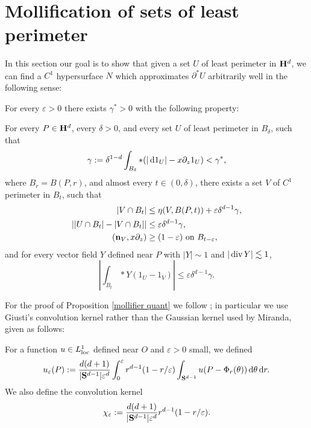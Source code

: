 \section{Mollification of sets of least perimeter}\label{MollifierSection}
In this section our goal is to show that given a set $U$ of least perimeter in $\mathbf H^d$, we can find a $C^1$ hypersurface $N$ which approximates $\partial^* U$ arbitrarily well in the following sense:

\begin{proposition}\label{mollifier quant}
    For every $\varepsilon > 0$ there exists $\gamma^* > 0$ with the following property:

    For every $P \in \mathbf H^d$, every $\delta > 0$, and every set $U$ of least perimeter in $B_\delta$, such that
    \begin{equation}\label{bootstrap the mollifier}
    \gamma := \delta^{1 - d}\int_{B_\delta} *(|\mathop{}\!\mathrm{d} 1_U| - x\partial_z 1_U) < \gamma^*,
    \end{equation}
    where $B_r = B(P, r)$, and almost every $t \in (0, \delta)$, there exists a set $V$ of $C^1$ perimeter in $B_t$, such that
    \begin{align}
    |V \cap B_t| &\leq \eta(V, B(P, t)) + \varepsilon \delta^{d - 1} \gamma, \label{mollifier quant1}\\
    \left||U \cap B_t| - |V \cap B_t|\right| &\leq \varepsilon \delta^{d - 1} \gamma, \label{mollifier quant2}\\
    (\mathbf n_V, x\partial_z) &\geq (1 - \varepsilon) \text{ on } B_{t-\varepsilon}, \label{mollifier quant4}
    \end{align}
    and for every vector field $Y$ defined near $P$ with $|Y| \sim 1$ and $|\operatorname{div} Y| \lesssim 1$,
    \begin{equation}
    \left|\int_{B_t} *Y(1_U - 1_V)\right| \leq \varepsilon \delta^{d - 1} \gamma. \label{mollifier quant3}
    \end{equation}
\end{proposition}

For the proof of Proposition \ref{mollifier quant} we follow \cite[Chapter 7]{Giusti77}; in particular we use Giusti's convolution kernel rather than the Gaussian kernel used by Miranda, given as follows:

\begin{definition}
For a function $u \in L^1_{\mathrm{loc}}$ defined near $O$ and $\varepsilon > 0$ small, we defined
$$u_\varepsilon(P) := \frac{d(d + 1)}{|\mathbf S^{d - 1}| \varepsilon^d} \int_0^\varepsilon r^{d - 1}(1 - r/\varepsilon) \int_{\mathbf S^{d - 1}} u(P - \Phi_r(\theta)) \mathop{}\!\mathrm{d} \theta \mathop{}\!\mathrm{d} r.$$
We also define the convolution kernel
$$\chi_\varepsilon := \frac{d(d + 1)}{|\mathbf S^{d - 1}| \varepsilon^d}r^{d - 1}(1 - r/\varepsilon).$$
\end{definition}

